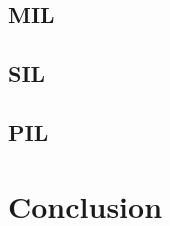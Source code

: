 \documentclass[12pt,a4paper]{report}
\begin{document}
\section{MIL}
\section{SIL}
\section{PIL}


\chapter{Conclusion}
	
	
\end{document}
